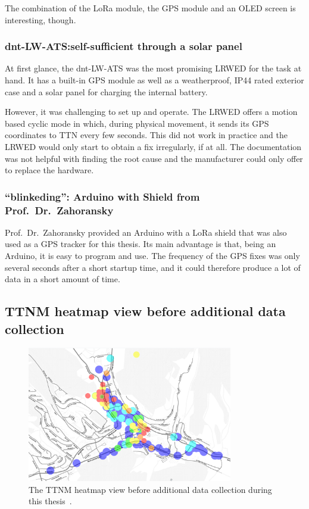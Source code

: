 The combination of the \ac{LoRa} module, the \ac{GPS} module and an \ac{OLED} screen is interesting, though.

\subsubsection{dnt-LW-ATS:\@ self-sufficient through a solar panel}

At first glance, the dnt-LW-ATS was the most promising \acl{LRWED} for the task at hand.
It has a built-in \ac{GPS} module as well as a weatherproof, IP44 rated exterior case and a solar panel for charging the internal battery.

However, it was challenging to set up and operate.
The \acl{LRWED} offers a motion based cyclic mode in which, during physical movement, it sends its \ac{GPS} coordinates to \ac{TTN} every few seconds.
This did not work in practice and the \acl{LRWED} would only start to obtain a fix irregularly, if at all.
The documentation was not helpful with finding the root cause and the manufacturer could only offer to replace the hardware.

\subsubsection{``blinkeding'': Arduino with Shield from Prof.\ Dr.\ Zahoransky}

Prof.\ Dr.\ Zahoransky provided an Arduino with a \ac{LoRa} shield that was also used as a \ac{GPS} tracker for this thesis.
Its main advantage is that, being an Arduino, it is easy to program and use.
The frequency of the \ac{GPS} fixes was only several seconds after a short startup time, and it could therefore produce a lot of data in a short amount of time.

\subsection{\acl{TTNM} heatmap view before additional data collection}

\begin{figure}[htbp]
    \centering
    \includegraphics[width=0.8\textwidth]{pictures/ttn-mapper/ttnmapper_heatmap_before.png}
    \caption[\acl{TTNM} heatmap view before additional data collection]{
        The \ac{TTNM} heatmap view before additional data collection during this thesis~\cite{ttn_mapper_ttn_2023}.
    }\label{pic:ttnm-before-data-collection}
\end{figure}

